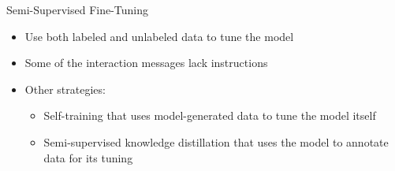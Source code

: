 \begin{vbframe}{Semi-Supervised Fine-Tuning}

\vfill

\begin{itemize}
\item Use both labeled and unlabeled data to tune the model
\item Some of the interaction messages lack instructions
\item Other strategies:
    \begin{itemize}
    \item Self-training that uses model-generated data to tune the model itself
    \item Semi-supervised knowledge distillation that uses the model to annotate data for its tuning
    \end{itemize}
\end{itemize}

\vfill

\end{vbframe}

